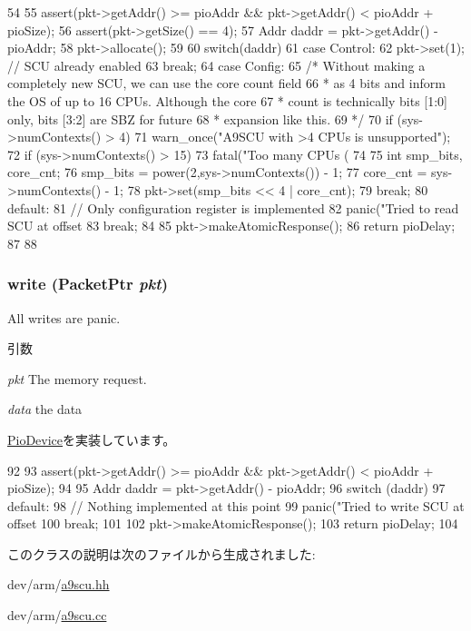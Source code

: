 \begin{DoxyCode}
54 {
55     assert(pkt->getAddr() >= pioAddr && pkt->getAddr() < pioAddr + pioSize);
56     assert(pkt->getSize() == 4);
57     Addr daddr = pkt->getAddr() - pioAddr;
58     pkt->allocate();
59 
60     switch(daddr) {
61       case Control:
62         pkt->set(1); // SCU already enabled
63         break;
64       case Config:
65         /* Without making a completely new SCU, we can use the core count field
66          * as 4 bits and inform the OS of up to 16 CPUs.  Although the core
67          * count is technically bits [1:0] only, bits [3:2] are SBZ for future
68          * expansion like this.
69          */
70         if (sys->numContexts() > 4) {
71             warn_once("A9SCU with >4 CPUs is unsupported\n");
72             if (sys->numContexts() > 15)
73                 fatal("Too many CPUs (%
74         }
75         int smp_bits, core_cnt;
76         smp_bits = power(2,sys->numContexts()) - 1;
77         core_cnt = sys->numContexts() - 1;
78         pkt->set(smp_bits << 4 | core_cnt);
79         break;
80       default:
81         // Only configuration register is implemented
82         panic("Tried to read SCU at offset %
83         break;
84     }
85     pkt->makeAtomicResponse();
86     return pioDelay;
87 
88 }
\end{DoxyCode}
\hypertarget{classA9SCU_a4cefab464e72b5dd42c003a0a4341802}{
\subsubsection[{write}]{ write ({\bf PacketPtr} {\em pkt})}}
\label{classA9SCU_a4cefab464e72b5dd42c003a0a4341802}
All writes are panic. 
\begin{DoxyParams}{引数}
\item[{\em pkt}]The memory request. \item[{\em data}]the data \end{DoxyParams}


\hyperlink{classPioDevice_afe8371668d023bb2516b286e5e399b6f}{PioDevice}を実装しています。


\begin{DoxyCode}
92 {
93     assert(pkt->getAddr() >= pioAddr && pkt->getAddr() < pioAddr + pioSize);
94 
95     Addr daddr = pkt->getAddr() - pioAddr;
96     switch (daddr) {
97       default:
98         // Nothing implemented at this point
99         panic("Tried to write SCU at offset %
100         break;
101     }
102     pkt->makeAtomicResponse();
103     return pioDelay;
104 }
\end{DoxyCode}


このクラスの説明は次のファイルから生成されました:\begin{DoxyCompactItemize}
\item 
dev/arm/\hyperlink{a9scu_8hh}{a9scu.hh}\item 
dev/arm/\hyperlink{a9scu_8cc}{a9scu.cc}\end{DoxyCompactItemize}
